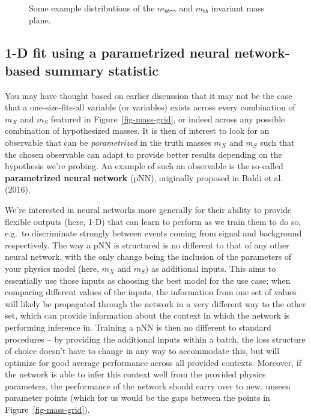\documentclass[
  11pt,
  numbers=noendperiod]{book}
\begin{document}
\begin{figure}
\begin{minipage}[t]{0.50\linewidth}
{{}


}

\end{minipage}%

\caption{\label{fig-2d-examples}Some example distributions of the
\(m_{bb\gamma\gamma}\) and \(m_{bb}\) invariant mass plane.}

\end{figure}

\hypertarget{d-fit-using-a-parametrized-neural-network-based-summary-statistic}{%
\subsection{1-D fit using a parametrized neural network-based summary
statistic}\label{d-fit-using-a-parametrized-neural-network-based-summary-statistic}}

You may have thought based on earlier discussion that it may not be the
case that a one-size-fits-all variable (or variables) exists across
every combination of \(m_X\) and \(m_S\) featured in
Figure~\ref{fig-mass-grid}, or indeed across any possible combination of
hypothesized masses. It is then of interest to look for an observable
that can be \emph{parametrized} in the truth masses \(m_X\) and \(m_S\)
such that the chosen observable can adapt to provide better results
depending on the hypothesis we're probing. An example of such an
observable is the so-called \textbf{parametrized neural network} (pNN),
originally proposed in Baldi et al. (2016).

We're interested in neural networks more generally for their ability to
provide flexible outputs (here, 1-D) that can learn to perform as we
train them to do so, e.g.~to discriminate strongly between events coming
from signal and background respectively. The way a pNN is structured is
no different to that of any other neural network, with the only change
being the inclusion of the parameters of your physics model (here,
\(m_X\) and \(m_S\)) as additional inputs. This aims to essentially use
those inputs as choosing the best model for the use case; when comparing
different values of the inputs, the information from one set of values
will likely be propagated through the network in a very different way to
the other set, which can provide information about the context in which
the network is performing inference in. Training a pNN is then no
different to standard procedures -- by providing the additional inputs
within a batch, the loss structure of choice doesn't have to change in
any way to accommodate this, but will optimize for good average
performance across all provided contexts. Moreover, if the network is
able to infer this context well from the provided physics parameters,
the performance of the network should carry over to new, unseen
parameter points (which for us would be the gaps between the points in
Figure~\ref{fig-mass-grid}).
\end{document}
